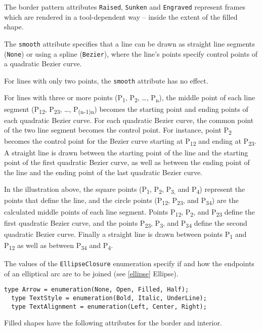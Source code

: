 The border pattern attributes \lstinline!Raised!, \lstinline!Sunken! and \lstinline!Engraved! represent frames
which are rendered in a tool-dependent way -- inside the extent of the
filled shape.

The \lstinline!smooth! attribute specifies that a line can be drawn as straight line
segments (\lstinline!None!) or using a spline (\lstinline!Bezier!), where the line's points
specify control points of a quadratic Bezier curve.

For lines with only two points, the \lstinline!smooth! attribute has no effect.

For lines with three or more points (P\textsubscript{1},
P\textsubscript{2}, \ldots{}, P\textsubscript{n}), the middle point of
each line segment (P\textsubscript{12}, P\textsubscript{23}, \ldots{},
P\textsubscript{(n-1)n}) becomes the starting point and ending points of
each quadratic Bezier curve. For each quadratic Bezier curve, the common
point of the two line segment becomes the control point. For instance,
point P\textsubscript{2} becomes the control point for the Bezier curve
starting at P\textsubscript{12} and ending at P\textsubscript{23}. A
straight line is drawn between the starting point of the line and the
starting point of the first quadratic Bezier curve, as well as between
the ending point of the line and the ending point of the last quadratic
Bezier curve.

In the illustration above, the square points (P\textsubscript{1},
P\textsubscript{2}, P\textsubscript{3,} and P\textsubscript{4})
represent the points that define the line, and the circle points
(P\textsubscript{12}, P\textsubscript{23}, and P\textsubscript{34}) are
the calculated middle points of each line segment. Points
P\textsubscript{12}, P\textsubscript{2}, and P\textsubscript{23} define
the first quadratic Bezier curve, and the points P\textsubscript{23},
P\textsubscript{3}, and P\textsubscript{34} define the second quadratic
Bezier curve. Finally a straight line is drawn between points
P\textsubscript{1} and P\textsubscript{12} as well as between
P\textsubscript{34} and P\textsubscript{4}.

The values of the \lstinline!EllipseClosure! enumeration specify if and how the
endpoints of an elliptical arc are to be joined (see \autoref{ellipse} Ellipse).

\begin{lstlisting}[language=modelica]
  type Arrow = enumeration(None, Open, Filled, Half);
  type TextStyle = enumeration(Bold, Italic, UnderLine);
  type TextAlignment = enumeration(Left, Center, Right);
\end{lstlisting}
Filled shapes have the following attributes for the border and interior.

